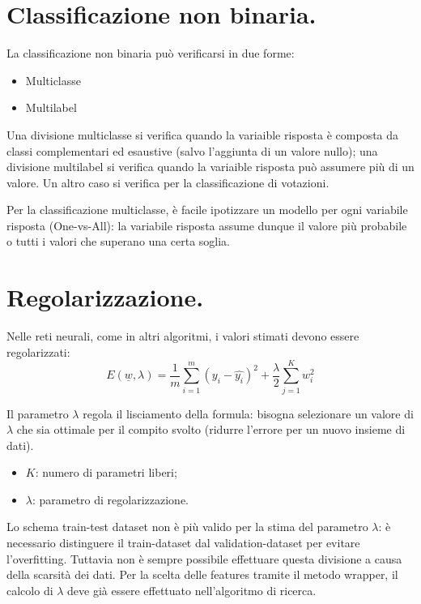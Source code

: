 \documentclass[11pt, a4page, twocolumn]{article}
\begin{document}
\section{Classificazione non binaria.}
La classificazione non binaria può verificarsi in due forme:
\begin{itemize}
  \item Multiclasse
  \item Multilabel
\end{itemize}
Una divisione multiclasse si verifica quando la variaible risposta è composta da classi complementari ed esaustive (salvo l'aggiunta di un valore nullo); una divisione multilabel si verifica quando la variaible risposta può assumere più di un valore.
Un altro caso si verifica per la classificazione di votazioni.

Per la classificazione multiclasse, è facile ipotizzare un modello per ogni variabile risposta (One-vs-All): la variabile risposta assume dunque il valore più probabile o tutti i valori che superano una certa soglia.


\section{Regolarizzazione.}
Nelle reti neurali, come in altri algoritmi, i valori stimati devono essere
regolarizzati:
\begin{equation*}
  E(\underline{w}, \lambda) = \frac{1}{m} \sum^m_{i=1}{(y_i - \widehat{y_i})^2} + \frac{\lambda{}}{2} \sum^K_{j=1}{w_i^2}
\end{equation*}
  
Il parametro $\lambda$ regola il lisciamento della formula: bisogna selezionare un valore di $\lambda$ che sia ottimale per il compito svolto (ridurre l'errore per un nuovo insieme di dati).
\begin{itemize}
  \item $K$: numero di parametri liberi;
  \item $\lambda$: parametro di regolarizzazione.
\end{itemize}

Lo schema train-test dataset non è più valido per la stima del parametro $\lambda$: è necessario distinguere il train-dataset dal validation-dataset per evitare l'overfitting.
Tuttavia non è sempre possibile effettuare questa divisione a causa della scarsità dei dati. \newline
Per la scelta delle features tramite il metodo wrapper, il calcolo di $\lambda$ deve già essere effettuato nell'algoritmo di ricerca. \newline
\end{document}

